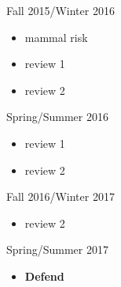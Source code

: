 \documentclass[12pt,letterpaper]{article}
\begin{document}
Fall 2015/Winter 2016
\begin{itemize}
  \item mammal risk
  \item review 1
  \item review 2
\end{itemize}

Spring/Summer 2016
\begin{itemize}
  \item review 1
  \item review 2
\end{itemize}

Fall 2016/Winter 2017
\begin{itemize}
  \item review 2
\end{itemize}

Spring/Summer 2017
\begin{itemize}
  \item \textbf{Defend}
\end{itemize}



\clearpage


\end{document}
